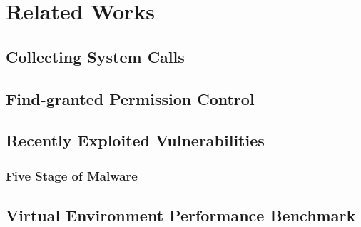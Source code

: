 \chapter{Related Works}

\section{Collecting System Calls}

\section{Find-granted Permission Control}

\section{Recently Exploited Vulnerabilities}
\subsection{Five Stage of Malware}

\section{Virtual Environment Performance Benchmark}